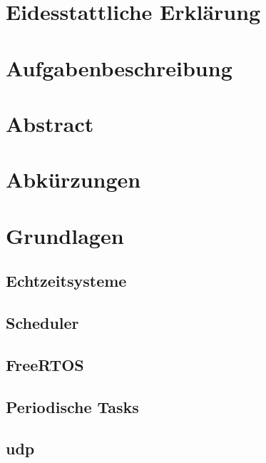 \documentclass{scrartcl}
\begin{document}
	\begin{titlepage}
		
	\end{titlepage}
	\clearpage 
	\section*{Eidesstattliche Erklärung}
		
		\clearpage
	\section*{Aufgabenbeschreibung}
		
		\clearpage
	\section*{Abstract}
		
		\clearpage
	\tableofcontents
		\clearpage
	\section*{Abkürzungen}
		
		\clearpage
	\clearpage
	\section{Grundlagen}
		\subsection{Echtzeitsysteme} \label{section:echtzeitsysteme}
			
		\subsection{Scheduler} \label{section:scheduler}
			
		\subsection{FreeRTOS} \label{section:freertos}
			
		\subsection{Periodische Tasks} \label{section:periodische_tasks}
			
		\subsection{\ac{udp}} \label{section:udp}
			
\end{document}
